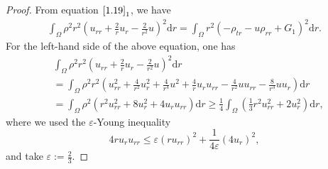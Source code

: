 \documentclass[11pt,reqno]{amsart}
\numberwithin{equation}{section}
\newcommand{\dif}{\mathrm{d}}
\begin{document}
\begin{proof}
From equation $\eqref{1.19}_1$, we have
\begin{align}\label{1.55}
\int_{\Omega} \rho^2 r^2 \left(u_{rr}+\frac{2}{r}u_r-\frac{2}{r^2} u\right)^2 \dif r =\int_{\Omega} r^2 \left(-\rho_{tr}-u \rho_{rr}+G_1\right)^2 \dif r.
\end{align}
For the left-hand side of the above equation, one has
\begin{align*}
&\int_{\Omega} \rho^2 r^2 \left( u_{rr}+\frac{2}{r}u_r-\frac{2}{r^2} u\right)^2 \dif r\\
&=\int_{\Omega} \rho^2 r^2\left( u_{rr}^2+\frac{4}{r^2} u_r^2+\frac{4}{r^4} u^2+\frac{4}{r} u_ru_{rr}-\frac{4}{r^2} u u_{rr}-\frac{8}{r^3} u u_r\right) \dif r\\
&=\int_{\Omega} \rho^2 \left( r^2 u_{rr}^2+8 u_r^2+4 u_r u_{rr}\right) \dif r \ge \frac{1}{4} \int_{\Omega} \left(\frac{1}{3} r^2 u_{rr}^2+2 u_r^2\right)\dif r ,
\end{align*}
where we used the $\varepsilon$-Young inequality
\[
4 r u_r u_{rr} \le \varepsilon (ru_{rr})^2+\frac{1}{4\varepsilon} (4u_r)^2,
\]
and take $\varepsilon:=\frac{2}{3}$.


\end{proof}
\end{document}
